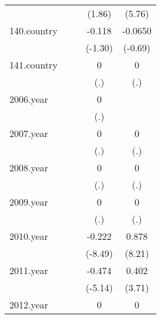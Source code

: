 {\begin{tabular}{l*{4}{c}}
            &                     &                     &      (1.86)         &      (5.76)         \\
[1em]
140.country &                     &                     &      -0.118         &     -0.0650         \\
            &                     &                     &     (-1.30)         &     (-0.69)         \\
[1em]
141.country &                     &                     &           0         &           0         \\
            &                     &                     &         (.)         &         (.)         \\
[1em]
2006.year   &                     &                     &           0         &                     \\
            &                     &                     &         (.)         &                     \\
[1em]
2007.year   &                     &                     &           0         &           0         \\
            &                     &                     &         (.)         &         (.)         \\
[1em]
2008.year   &                     &                     &           0         &           0         \\
            &                     &                     &         (.)         &         (.)         \\
[1em]
2009.year   &                     &                     &           0         &           0         \\
            &                     &                     &         (.)         &         (.)         \\
[1em]
2010.year   &                     &                     &      -0.222\sym{***}&       0.878\sym{***}\\
            &                     &                     &     (-8.49)         &      (8.21)         \\
[1em]
2011.year   &                     &                     &      -0.474\sym{***}&       0.402\sym{***}\\
            &                     &                     &     (-5.14)         &      (3.71)         \\
[1em]
2012.year   &                     &                     &           0         &           0         \\

\end{tabular}}
